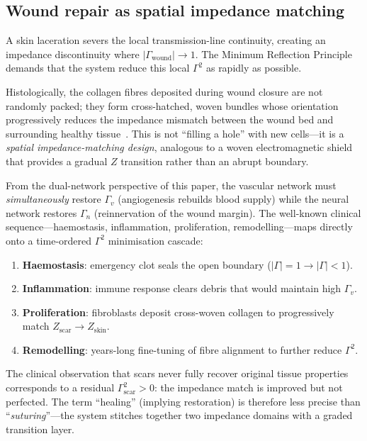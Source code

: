﻿\documentclass[aps,pre,twocolumn,superscriptaddress,floatfix]{revtex4-2}
\begin{document}
\subsection{Wound repair as spatial impedance matching}
\label{sec:wound-suturing}

A skin laceration severs the local transmission-line
continuity, creating an impedance discontinuity where
$|\Gamma_{\text{wound}}|\to 1$.
The Minimum Reflection Principle demands that the system
reduce this local $\Gamma^2$ as rapidly as possible.

Histologically, the collagen fibres deposited during wound
closure are not randomly packed; they form cross-hatched,
woven bundles whose orientation progressively reduces the
impedance mismatch between the wound bed and surrounding
healthy tissue~\cite{Gurtner2008}.
This is not ``filling a hole'' with new cells---it is a
\emph{spatial impedance-matching design}, analogous to a
woven electromagnetic shield that provides a gradual
$Z$ transition rather than an abrupt boundary.

From the dual-network perspective of this paper, the
vascular network must \emph{simultaneously} restore
$\Gamma_v$ (angiogenesis rebuilds blood supply)
while the neural network restores $\Gamma_n$
(reinnervation of the wound margin).
The well-known clinical sequence---haemostasis,
inflammation, proliferation, remodelling---maps directly
onto a time-ordered $\Gamma^2$ minimisation cascade:
\begin{enumerate}
  \item \textbf{Haemostasis}: emergency clot seals the
    open boundary ($|\Gamma|=1\to |\Gamma|<1$).
  \item \textbf{Inflammation}: immune response clears
    debris that would maintain high $\Gamma_v$.
  \item \textbf{Proliferation}: fibroblasts deposit
    cross-woven collagen to progressively match
    $Z_{\text{scar}}\to Z_{\text{skin}}$.
  \item \textbf{Remodelling}: years-long fine-tuning
    of fibre alignment to further reduce $\Gamma^2$.
\end{enumerate}

The clinical observation that scars never fully recover
original tissue properties corresponds to a residual
$\Gamma_{\text{scar}}^2>0$: the impedance match is
improved but not perfected.
The term ``healing'' (implying restoration) is therefore
less precise than ``\emph{suturing}''---the system
stitches together two impedance domains with a graded
transition layer.
\end{document}

